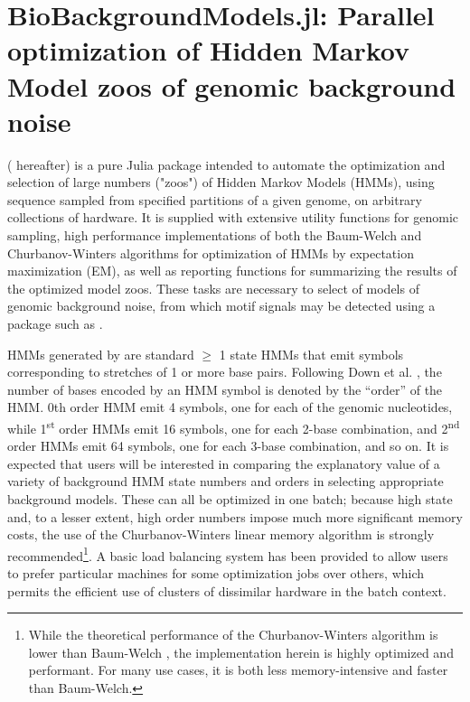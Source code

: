 \chapter{BioBackgroundModels.jl: Parallel optimization of Hidden Markov Model zoos of genomic background noise}
\label{chap:BBM}

 ( hereafter) is a pure Julia package intended to automate the optimization and selection of large numbers ("zoos") of Hidden Markov Models (HMMs), using sequence sampled from specified partitions of a given genome, on arbitrary collections of hardware. It is supplied with extensive utility functions for genomic sampling, high performance implementations of both the Baum-Welch and Churbanov-Winters algorithms for optimization of HMMs by expectation maximization (EM), as well as reporting functions for summarizing the results of the optimized model zoos. These tasks are necessary to select of models of genomic background noise, from which motif signals may be detected using a package such as .

HMMs generated by  are standard $\geq$ 1 state HMMs that emit symbols corresponding to stretches of 1 or more base pairs. Following Down et al. \cite{Down2005}, the number of bases encoded by an HMM symbol is denoted by the ``order'' of the HMM. 0th order HMM emit 4 symbols, one for each of the genomic nucleotides, while 1\textsuperscript{st} order HMMs emit 16 symbols, one for each 2-base combination, and 2\textsuperscript{nd} order HMMs emit 64 symbols, one for each 3-base combination, and so on. It is expected that users will be interested in comparing the explanatory value of a variety of background HMM state numbers and orders in selecting appropriate background models. These can all be optimized in one batch; because high state and, to a lesser extent, high order numbers impose much more significant memory costs, the use of the Churbanov-Winters linear memory algorithm is strongly recommended\footnote{While the theoretical performance of the Churbanov-Winters algorithm is lower than Baum-Welch \cite{Churbanov2008}, the implementation herein is highly optimized and performant. For many use cases, it is both less memory-intensive and faster than Baum-Welch.}. A basic load balancing system has been provided to allow users to prefer particular machines for some optimization jobs over others, which permits the efficient use of clusters of dissimilar hardware in the batch context.

